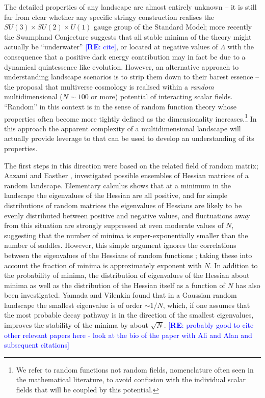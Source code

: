 \documentclass[12pt]{article}
\newcommand{\re}[1]{\textcolor{blue}{[{\bf RE}: #1]}}
\begin{document}
 The detailed properties of any landscape are almost entirely unknown -- it is still far from clear whether any specific stringy construction  realises  the $SU(3) \times SU(2) \times U(1)$ gauge group of the Standard Model; more recently the Swampland Conjecture suggests that all stable minima of the theory might actually be ``underwater'' \cite{Agrawal2018}\re{cite}, or located at negative values of $\Lambda$ with the consequence that a positive dark energy contribution may in fact be due to a dynamical quintessence like evolution.   However, an alternative approach to understanding  landscape scenarios is to strip them down to their barest essence -- the proposal that multiverse cosmology is realised within a {\em random\/} multidimensional ($N\sim100$ or more) potential of interacting scalar fields. ``Random'' in this context is  in the sense of random function theory \cite{GRF1, GRF2, GRF3} whose properties often become more tightly defined as the dimensionality increases.\footnote{We refer to random functions not random fields, nomenclature often seen in the mathematical literature, to avoid confusion with the individual scalar fields that will be coupled by this potential.} In this approach  the apparent complexity of a multidimensional landscape will actually provide  leverage to that can be used to develop an understanding of its properties. 
 
 The first steps in this direction were based on the related field of random matrix; Aazami and Easther \cite{Aazami2006}, investigated possible ensembles of Hessian matrices of a random landscape.  Elementary calculus shows that at a minimum in the landscape the eigenvalues of the Hessian are all positive, and for simple distributions of random matrices the eigenvalues of Hessians are likely to be evenly distributed between positive and negative values, and fluctuations away from this situation are strongly suppressed at even moderate values of $N$, suggesting that the number of minima is super-exponentially smaller than the number of saddles. However, this simple argument ignores the correlations between the eigenvalues of the Hessians of random functions \cite{Easther2016}; taking these into account the fraction of minima is approximately exponent with $N$.  In addition to the probability of minima, the distribution of eigenvalues of the Hessian about minima as well as the distribution of the Hessian itself as a function of $N$ has also been investigated.\cite{Yamada2018} Yamada and Vilenkin found that in a Gaussian random landscape the smallest eigenvalue is of order $\sim 1/N$, which, if one assumes that the most probable decay pathway is in the direction of the smallest eigenvalues, improves the stability of the minima by about $\sqrt{N}$. \re{probably good to cite other relevant papers here - look at the bio of the paper with Ali and Alan and subsequent citations}
  
\end{document}
